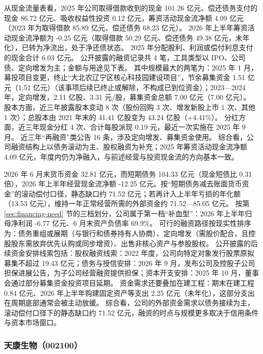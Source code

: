  从现金流量表看，2025 年公司取得借款收到的现金 101.26 亿元、偿还债务支付的现金 86.72 亿元、吸收权益性投资 0.12 亿元，筹资活动现金流净额 4.09 亿元（2023 年为取得借款 85.89 亿元、偿还债务 68.23 亿元）。 2026 年上半年筹资活动现金流净额为 -0.25 亿元（取得借款 50.29 亿元、偿还债务 49.38 亿元，未年化），已转为净流出，处于净还债状态。 2025 年分配股利、利润或偿付利息支付的现金合计 6.03 亿元。 公开披露的融资记录共 4 笔，工具类型以 IPO、公司债、定向增发为主；金额与用途见下表。 其中规模最大的两笔为：2025 年 1 月，募投项目变更，终止“大北农辽宁区核心科技园建设项目”，节余募集资金 1.51 亿元（1.51 亿元）（该事项后续已终止或解除，不构成已到位资金）；2023---2024 年，定向增发，2.11 亿股、3.31 元/股，募集资金总额 7.00 亿元（7.00 亿元）。 股本方面，近三年披露股本变动 8 次（股份回购 3 次、增发新股上市 1 次、其他 1 次）；总股本由 2021 年末的 41.41 亿股变为 43.24 亿股（+4.41\%）。 分红方面，近三年现金分红 4 次、合计每股派现 0.19 元，最近一次实施在 2025 年 9 月。 近三年“再融资”类公告 16 条，涉及定向增发、募集资金使用。 综合看，公司融资结构上以债务滚动为主、股权融资为补充；2025 年筹资活动现金流净额 4.09 亿元，年度内仍为净融入，与前述经营与投资现金流的方向基本一致。

 2026 年 6 月末货币资金 32.81 亿元，而短期债务 104.33 亿元（现金短债比 0.31 倍），2026 年上半年经营现金流净额 -12.25 亿元。按“短期债务减去账面货币资金”的滚动偿付口径，静态缺口约 71.52 亿元；若再计入上半年亏损的年化额（13.53 亿元），维持一年正常经营所需的外部资金约 71.52---85.05 亿元。 按第 \ref{sec:financing-need} 节的三档划分，公司属于第一档“补血型”：2026 年上半年归母净利润 -6.77 亿元、6 月末资产负债率 69.9\%。 可行的融资路径按现实性排序为：债务重组或展期（与银行和债券持有人协商）、定向增发（需股价配合，且控股股东需放弃优先认购或同步增资）、出售非核心资产与参股股权。 公开披露的后续资金安排线索包括：股权融资线索：2022 年度，公司向特定对象发行股票原拟募集不超过 19.43 亿元；债务与授信安排：2026 年 9 月，发布公司及控股子公司担保进展公告，为子公司经营融资提供担保；资本开支安排：2025 年 10 月，董事会通过部分募集资金投资项目延期。 资金需求还要叠加在建工程：期末在建工程 0.84 亿元、2026 年上半年购建固定资产等支出 2.25 亿元（未年化），这部分支出在周期底部通常会被主动放缓。 综合看，公司的外部资金需求以债务接续为主，滚动偿付口径下的静态缺口约 71.52 亿元，融资的时点与规模更多取决于信用条件与资本市场窗口。




\subsubsection{天康生物（002100）}
\label{co:002100}

